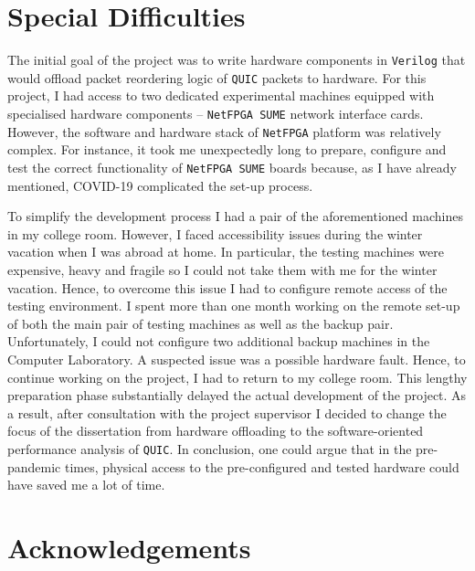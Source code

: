 \documentclass[12pt,a4paper,twoside,openright]{report}
\begin{document}
\section*{Special Difficulties}

The initial goal of the project was to write hardware components in \texttt{Verilog} that would offload packet reordering logic of \texttt{QUIC} packets to hardware.
For this project, I had access to two dedicated experimental machines equipped with specialised hardware components -- \texttt{NetFPGA SUME} network interface cards.
However, the software and hardware stack of \texttt{NetFPGA} platform was relatively complex.
For instance, it took me unexpectedly long to prepare, configure and test the correct functionality of \texttt{NetFPGA SUME} boards because, as I have already mentioned, COVID-19 complicated the set-up process.

To simplify the development process I had a pair of the aforementioned machines in my college room.
However, I faced accessibility issues during the winter vacation when I was abroad at home.
In particular, the testing machines were expensive, heavy and fragile so I could not take them with me for the winter vacation.
Hence, to overcome this issue I had to configure remote access of the testing environment.
I spent more than one month working on the remote set-up of both the main pair of testing machines as well as the backup pair.
Unfortunately, I could not configure two additional backup machines in the Computer Laboratory.
A suspected issue was a possible hardware fault.
Hence, to continue working on the project, I had to return to my college room.
This lengthy preparation phase substantially delayed the actual development of the project.
As a result, after consultation with the project supervisor I decided to change the focus of the dissertation from hardware offloading to the software-oriented performance analysis of \texttt{QUIC}. 
In conclusion, one could argue that in the pre-pandemic times, physical access to the pre-configured and tested hardware could have saved me a lot of time.






\tableofcontents

\listoffigures

\newpage
\section*{Acknowledgements}
\end{document}
